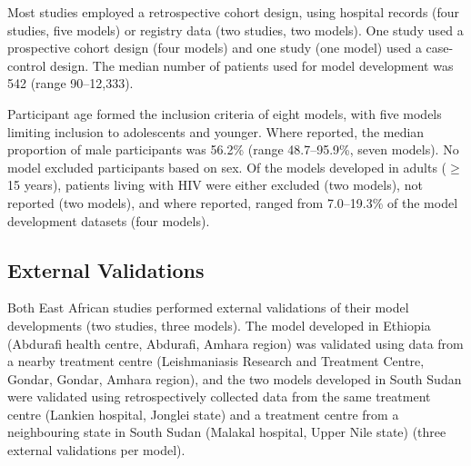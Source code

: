 Most studies employed a retrospective cohort design, using hospital records (four studies, five models)\cite{sampaioRiskFactorsDeath2010,kaminkClinicalSeverityScoring2017,foinquinosTemporalValidationPredictive2021,abongomeraDevelopmentExternalValidation2017} or registry data (two studies, two models)\cite{coura-vitalPrognosticFactorsScoring2014,dearaujoEarlyClinicalManifestations2012}. One study used a prospective cohort design (four models)\cite{costaPredictingDeathKalaazar2016} and one study (one model) used a case-control design\cite{werneckPrognosticFactorsDeath2003}. The median number of patients used for model development was 542 (range 90--12,333).

Participant age formed the inclusion criteria of eight models\cite{costaPredictingDeathKalaazar2016,sampaioRiskFactorsDeath2010,kaminkClinicalSeverityScoring2017,foinquinosTemporalValidationPredictive2021}, with five models limiting inclusion to adolescents and younger\cite{costaPredictingDeathKalaazar2016,sampaioRiskFactorsDeath2010,kaminkClinicalSeverityScoring2017,foinquinosTemporalValidationPredictive2021}. Where reported, the median proportion of male participants was 56.2\% (range 48.7--95.9\%, seven models).  No model excluded participants based on sex. Of the models developed in adults ($\geq$ 15 years), patients living with HIV were either excluded (two models)\cite{kaminkClinicalSeverityScoring2017}, not reported (two models)\cite{dearaujoEarlyClinicalManifestations2012,werneckPrognosticFactorsDeath2003}, and where reported, ranged from 7.0--19.3\% of the model development datasets (four models)\cite{abongomeraDevelopmentExternalValidation2017,costaPredictingDeathKalaazar2016,coura-vitalPrognosticFactorsScoring2014}.

\subsection{External Validations}

Both East African studies performed external validations of their model developments (two studies, three models)\cite{abongomeraDevelopmentExternalValidation2017,kaminkClinicalSeverityScoring2017}. The model developed in Ethiopia (Abdurafi health centre, Abdurafi, Amhara region) was validated using data from a nearby treatment centre (Leishmaniasis Research and Treatment Centre, Gondar, Gondar, Amhara region)\cite{abongomeraDevelopmentExternalValidation2017}, and the two models developed in South Sudan were validated using retrospectively collected data from the same treatment centre (Lankien hospital, Jonglei state) and a treatment centre from a neighbouring state in South Sudan (Malakal hospital, Upper Nile state) (three external validations per model)\cite{kaminkClinicalSeverityScoring2017}.

